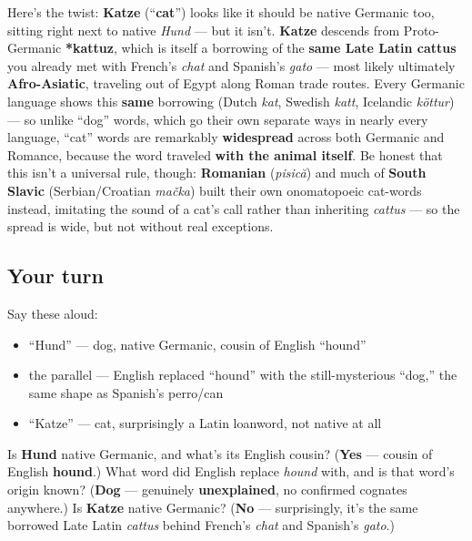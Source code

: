 \begin{cousinweb}
Here's the twist: \textbf{Katze} (\textquotedblleft{}\textbf{cat}\textquotedblright{}) looks like it should be native Germanic too, sitting right next to native \emph{Hund} — but it isn't. \textbf{Katze} descends from Proto-Germanic \textbf{*kattuz}, which is itself a borrowing of the \textbf{same Late Latin cattus} you already met with French's \emph{chat} and Spanish's \emph{gato} — most likely ultimately \textbf{Afro-Asiatic}, traveling out of Egypt along Roman trade routes. Every Germanic language shows this \textbf{same} borrowing (Dutch \emph{kat}, Swedish \emph{katt}, Icelandic \emph{köttur}) — so unlike \textquotedblleft{}dog\textquotedblright{} words, which go their own separate ways in nearly every language, \textquotedblleft{}cat\textquotedblright{} words are remarkably \textbf{widespread} across both Germanic and Romance, because the word traveled \textbf{with the animal itself}. Be honest that this isn't a universal rule, though: \textbf{Romanian} (\emph{pisică}) and much of \textbf{South Slavic} (Serbian/Croatian \emph{mačka}) built their own onomatopoeic cat-words instead, imitating the sound of a cat's call rather than inheriting \emph{cattus} — so the spread is wide, but not without real exceptions.
\end{cousinweb}

\subsection*{Your turn}
Say these aloud:

\begin{itemize}
\raggedright
  \item \textquotedblleft{}Hund\textquotedblright{} — dog, native Germanic, cousin of English \textquotedblleft{}hound\textquotedblright{}
  \item the parallel — English replaced \textquotedblleft{}hound\textquotedblright{} with the still-mysterious \textquotedblleft{}dog,\textquotedblright{} the same shape as Spanish's perro/can
  \item \textquotedblleft{}Katze\textquotedblright{} — cat, surprisingly a Latin loanword, not native at all
\end{itemize}

\begin{tcolorbox}[breakable,colback=teal!4,colframe=teal!35!black,title={Before you move on}]
Is \textbf{Hund} native Germanic, and what's its English cousin? (\textbf{Yes} — cousin of English \textbf{hound}.) What word did English replace \emph{hound} with, and is that word's origin known? (\textbf{Dog} — genuinely \textbf{unexplained}, no confirmed cognates anywhere.) Is \textbf{Katze} native Germanic? (\textbf{No} — surprisingly, it's the same borrowed Late Latin \emph{cattus} behind French's \emph{chat} and Spanish's \emph{gato}.)
\end{tcolorbox}
